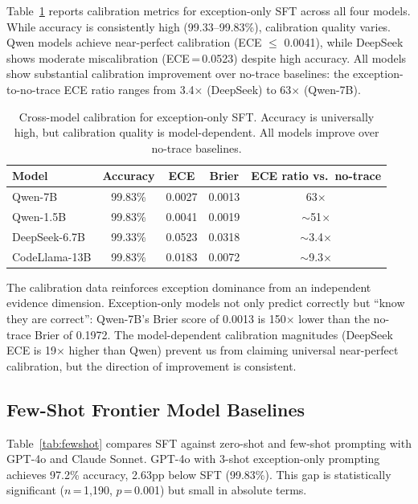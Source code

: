 \documentclass[11pt]{article}
\begin{document}
Table~\ref{tab:calibration} reports calibration metrics for exception-only SFT across all four models. While accuracy is consistently high (99.33--99.83\%), calibration quality varies. Qwen models achieve near-perfect calibration (ECE $\leq$ 0.0041), while DeepSeek shows moderate miscalibration (ECE\,=\,0.0523) despite high accuracy. All models show substantial calibration improvement over no-trace baselines: the exception-to-no-trace ECE ratio ranges from 3.4$\times$ (DeepSeek) to 63$\times$ (Qwen-7B).

\begin{table}[t]
\centering
\caption{Cross-model calibration for exception-only SFT. Accuracy is universally high, but calibration quality is model-dependent. All models improve over no-trace baselines.}
\label{tab:calibration}
\small
\begin{tabular}{lcccc}
\toprule
\textbf{Model} & \textbf{Accuracy} & \textbf{ECE} & \textbf{Brier} & \textbf{ECE ratio vs.\ no-trace} \\
\midrule
Qwen-7B & 99.83\% & 0.0027 & 0.0013 & 63$\times$ \\
Qwen-1.5B & 99.83\% & 0.0041 & 0.0019 & $\sim$51$\times$ \\
DeepSeek-6.7B & 99.33\% & 0.0523 & 0.0318 & $\sim$3.4$\times$ \\
CodeLlama-13B & 99.83\% & 0.0183 & 0.0072 & $\sim$9.3$\times$ \\
\bottomrule
\end{tabular}
\end{table}

The calibration data reinforces exception dominance from an independent evidence dimension. Exception-only models not only predict correctly but ``know they are correct'': Qwen-7B's Brier score of 0.0013 is 150$\times$ lower than the no-trace Brier of 0.1972. The model-dependent calibration magnitudes (DeepSeek ECE is 19$\times$ higher than Qwen) prevent us from claiming universal near-perfect calibration, but the direction of improvement is consistent.

\subsection{Few-Shot Frontier Model Baselines}
\label{sec:exp-fewshot}

Table~\ref{tab:fewshot} compares SFT against zero-shot and few-shot prompting with GPT-4o and Claude Sonnet. GPT-4o with 3-shot exception-only prompting achieves 97.2\% accuracy, 2.63pp below SFT (99.83\%). This gap is statistically significant ($n$\,=\,1{,}190, $p$\,=\,0.001) but small in absolute terms.
\end{document}
